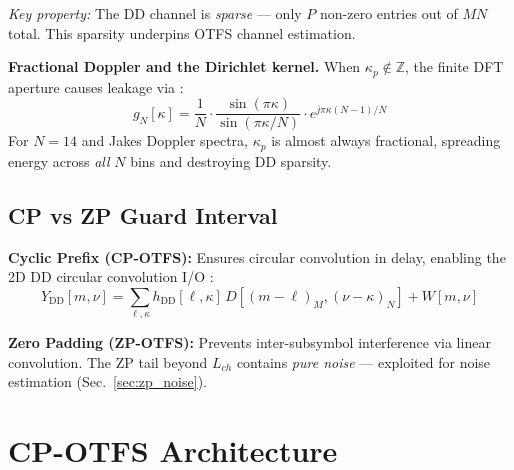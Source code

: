 \documentclass[11pt,a4paper,twoside]{article}
\begin{document}
\textit{Key property:} The DD channel is \emph{sparse} --- only $P$ non-zero entries out of $MN$ total. This sparsity underpins OTFS channel estimation.

\textbf{Fractional Doppler and the Dirichlet kernel.} When $\kappa_p \notin \mathbb{Z}$, the finite DFT aperture causes leakage via \cite{raviteja2019}:
\begin{equation}
    g_N[\kappa] = \frac{1}{N} \cdot \frac{\sin(\pi \kappa)}{\sin(\pi \kappa / N)} \cdot e^{j\pi\kappa(N-1)/N}
    \label{eq:dirichlet}
\end{equation}
For $N = 14$ and Jakes Doppler spectra, $\kappa_p$ is almost always fractional, spreading energy across \emph{all} $N$ bins and destroying DD sparsity.

\subsection{CP vs ZP Guard Interval}
\label{sec:cp_vs_zp}

\textbf{Cyclic Prefix (CP-OTFS):} Ensures circular convolution in delay, enabling the 2D DD circular convolution I/O \cite{hadani2017}:
\begin{equation}
    Y_{\text{DD}}[m, \nu] = \sum_{\ell,\kappa} h_{\text{DD}}[\ell, \kappa] \, D[(m{-}\ell)_M, (\nu{-}\kappa)_N] + W[m, \nu]
\end{equation}

\textbf{Zero Padding (ZP-OTFS):} Prevents inter-subsymbol interference via linear convolution. The ZP tail beyond $L_{ch}$ contains \emph{pure noise} --- exploited for noise estimation (Sec.~\ref{sec:zp_noise}).

\section{CP-OTFS Architecture}
\label{sec:cp_otfs}
\end{document}
